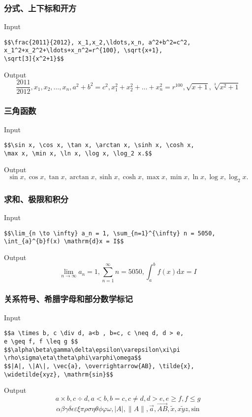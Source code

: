 \begin{frame}[fragile]\frametitle{分式、上下标和开方}
    \begin{block}{Input}
    \begin{verbatim}
$$\frac{2011}{2012}, x_1,x_2,\ldots,x_n, a^2+b^2=c^2,
x_1^2+x_2^2+\ldots+x_n^2=r^{100}, \sqrt{x+1},
\sqrt[3]{x^2+1}$$
    \end{verbatim}
    \end{block}
    \begin{block}{Output}
        $$\frac{2011}{2012}, x_1,x_2,\ldots,x_n, a^2+b^2=c^2, x_1^2+x_2^2+\ldots+x_n^2=r^{100}, \sqrt{x+1}, \sqrt[3]{x^2+1}$$
    \end{block}
\end{frame}

\begin{frame}[fragile]\frametitle{三角函数}
    \begin{block}{Input}
    \begin{verbatim}
$$\sin x, \cos x, \tan x, \arctan x, \sinh x, \cosh x,
\max x, \min x, \ln x, \log x, \log_2 x.$$
    \end{verbatim}
    \end{block}
    \begin{block}{Output}
        $$\sin x, \cos x, \tan x, \arctan x, \sinh x, \cosh x, \max x, \min x
        , \ln x, \log x, \log_2 x.$$
    \end{block}
\end{frame}

\begin{frame}[fragile]\frametitle{求和、极限和积分}
    \begin{block}{Input}
    \begin{verbatim}
$$\lim_{n \to \infty} a_n = 1, \sum_{n=1}^{\infty} n = 5050,
\int_{a}^{b}f(x) \mathrm{d}x = I$$
    \end{verbatim}
    \end{block}
    \begin{block}{Output}
        $$\lim_{n \to \infty} a_n = 1, \sum_{n=1}^{\infty} n = 5050,
        \int_{a}^{b}f(x) \mathrm{d}x = I$$
    \end{block}
\end{frame}

\begin{frame}[fragile]\frametitle{关系符号、希腊字母和部分数学标记}
    \begin{block}{Input}
    \begin{verbatim}
$$a \times b, c \div d, a<b , b=c, c \neq d, d > e,
e \geq f, f \leq g $$
$$\alpha\beta\gamma\delta\epsilon\varepsilon\xi\pi
\rho\sigma\eta\theta\phi\varphi\omega$$
$$|A|, \|A\|, \vec{a}, \overrightarrow{AB}, \tilde{x},
\widetilde{xyz}, \mathrm{sin}$$
    \end{verbatim}
    \end{block}
    \begin{block}{Output}
        $$a \times b, c \div d, a<b , b=c, c \neq d, d > e, e \geq f, f \leq g $$
        $$\alpha\beta\gamma\delta\epsilon\varepsilon\xi\pi\rho\sigma\eta
        \theta\phi\varphi\omega ,|A|, \|A\|, \vec{a}, \overrightarrow{AB}, \tilde{x},
        \widetilde{xyz}, \mathrm{sin}$$
    \end{block}
\end{frame}

